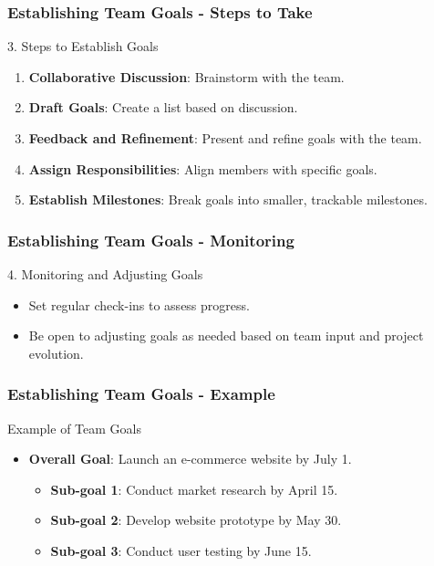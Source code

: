 \documentclass[aspectratio=169]{beamer}
\begin{document}
\begin{frame}[fragile]
    \frametitle{Establishing Team Goals - Steps to Take}
    \begin{block}{3. Steps to Establish Goals}
        \begin{enumerate}
            \item \textbf{Collaborative Discussion}: Brainstorm with the team.
            \item \textbf{Draft Goals}: Create a list based on discussion.
            \item \textbf{Feedback and Refinement}: Present and refine goals with the team.
            \item \textbf{Assign Responsibilities}: Align members with specific goals.
            \item \textbf{Establish Milestones}: Break goals into smaller, trackable milestones.
        \end{enumerate}
    \end{block}
\end{frame}

\begin{frame}[fragile]
    \frametitle{Establishing Team Goals - Monitoring}
    \begin{block}{4. Monitoring and Adjusting Goals}
        \begin{itemize}
            \item Set regular check-ins to assess progress.
            \item Be open to adjusting goals as needed based on team input and project evolution.
        \end{itemize}
    \end{block}
\end{frame}

\begin{frame}[fragile]
    \frametitle{Establishing Team Goals - Example}
    \begin{block}{Example of Team Goals}
        \begin{itemize}
            \item \textbf{Overall Goal}: Launch an e-commerce website by July 1.
                \begin{itemize}
                    \item \textbf{Sub-goal 1}: Conduct market research by April 15.
                    \item \textbf{Sub-goal 2}: Develop website prototype by May 30.
                    \item \textbf{Sub-goal 3}: Conduct user testing by June 15.
                \end{itemize}
        \end{itemize}
    \end{block}
\end{frame}
\end{document}
